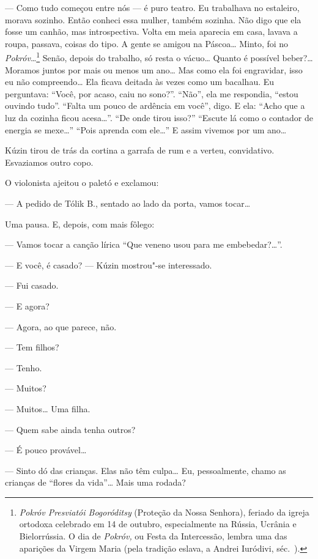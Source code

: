 --- Como tudo começou entre nós --- é puro teatro. Eu trabalhava no
estaleiro, morava sozinho. Então conheci essa mulher, também sozinha.
Não digo que ela fosse um canhão, mas introspectiva. Volta em meia
aparecia em casa, lavava a roupa, passava, coisas do tipo. A gente se
amigou na Páscoa\ldots{} Minto, foi no \emph{Pokróv}\ldots{}\footnote{\emph{Pokróv
  Presviatói Bogoróditsy} (Proteção da Nossa Senhora), feriado da igreja
  ortodoxa celebrado em 14 de outubro, especialmente na Rússia, Ucrânia
  e Bielorrússia. O dia de \emph{Pokróv,} ou Festa da Intercessão,
  lembra uma das aparições da Virgem Maria (pela tradição eslava, a
  Andrei Iuródivi, séc.~).} Senão, depois do trabalho, só resta o
vácuo\ldots{} Quanto é possível beber?\ldots{} Moramos juntos por mais ou menos um
ano\ldots{} Mas como ela foi engravidar, isso eu não compreendo\ldots{} Ela ficava
deitada às vezes como um bacalhau. Eu perguntava: ``Você, por acaso,
caiu no sono?''. ``Não'', ela me respondia, ``estou ouvindo tudo''.
``Falta um pouco de ardência em você'', digo. E ela: ``Acho que a luz da
cozinha ficou acesa\ldots{}''. ``De onde tirou isso?'' ``Escute lá como o
contador de energia se mexe\ldots{}'' ``Pois aprenda com ele\ldots{}'' E assim
vivemos por um ano\ldots{}

Kúzin tirou de trás da cortina a garrafa de rum e a verteu, convidativo.
Esvaziamos outro copo.

O violonista ajeitou o paletó e exclamou:

--- A pedido de Tólik B., sentado ao lado da porta, vamos tocar\ldots{}

Uma pausa. E, depois, com mais fôlego:

--- Vamos tocar a canção lírica ``Que veneno usou para me
embebedar?\ldots{}''.

--- E você, é casado? --- Kúzin mostrou"-se interessado.

--- Fui casado.

--- E agora?

--- Agora, ao que parece, não.

--- Tem filhos?

--- Tenho.

--- Muitos?

--- Muitos\ldots{} Uma filha.

--- Quem sabe ainda tenha outros?

--- É pouco provável\ldots{}

--- Sinto dó das crianças. Elas não têm culpa\ldots{} Eu, pessoalmente, chamo
as crianças de ``flores da vida''\ldots{} Mais uma rodada?

